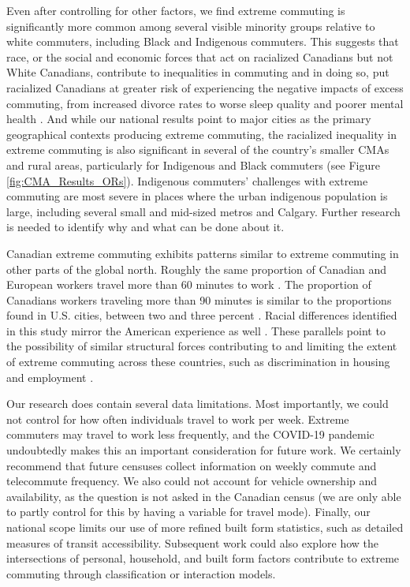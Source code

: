 \documentclass[10 pt,letterpaper]{article}
\begin{document}
Even after controlling for other factors, we find extreme commuting is significantly more common among several visible minority groups relative to white commuters, including Black and Indigenous commuters. This suggests that race, or the social and economic forces that act on racialized Canadians but not White Canadians, contribute to inequalities in commuting and in doing so, put racialized Canadians at greater risk of experiencing the negative impacts of excess commuting, from increased divorce rates to worse sleep quality and poorer mental health \cite{hansson_relationship_2011, roberts_its_2011, sandow_til_2019}. And while our national results point to major cities as the primary geographical contexts producing extreme commuting, the racialized inequality in extreme commuting is also significant in several of the country's smaller CMAs and rural areas, particularly for Indigenous and Black commuters (see Figure \ref{fig:CMA_Results_ORs}). Indigenous commuters' challenges with extreme commuting are most severe in places where the urban indigenous population is large, including several small and mid-sized metros and Calgary. Further research is needed to identify why and what can be done about it.

Canadian extreme commuting exhibits patterns similar to extreme commuting in other parts of the global north. Roughly the same proportion of Canadian and European workers travel more than 60 minutes to work \cite{vincent-geslin_determinants_2016}. The proportion of Canadians workers traveling more than 90 minutes is similar to the proportions found in U.S. cities, between two and three percent \cite{marion_comparison_2007}.  Racial differences identified in this study mirror the American experience as well \cite{mclafferty_who_2019,preston_revisiting_2016}. These parallels point to the possibility of similar structural forces contributing to and limiting the extent of extreme commuting across these countries, such as discrimination in housing \cite{murdie2002housing} and employment \cite{galabuzi2006canada,dietz2015skill}. 

Our research does contain several data limitations. Most importantly, we could not control for how often individuals travel to work per week. Extreme commuters may travel to work less frequently, and the COVID-19 pandemic undoubtedly makes this an important consideration for future work. We certainly recommend that future censuses collect information on weekly commute and telecommute frequency. We also could not account for vehicle ownership and availability, as the question is not asked in the Canadian census (we are only able to partly control for this by having a variable for travel mode). Finally, our national scope limits our use of more refined built form statistics, such as detailed measures of transit accessibility. Subsequent work could also explore how the intersections of personal, household, and built form factors contribute to extreme commuting through classification or interaction models. 
\end{document}
